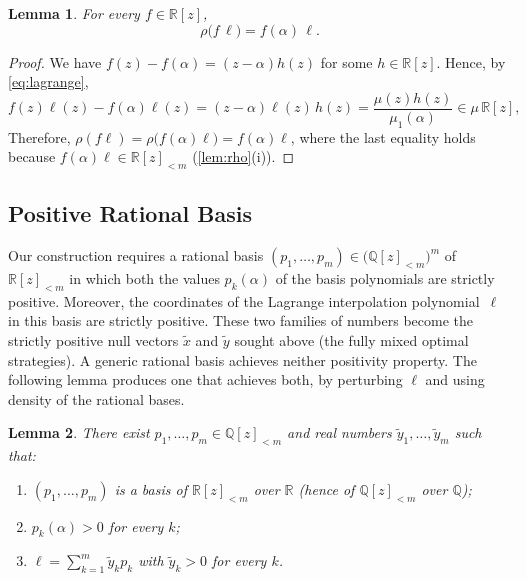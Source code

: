 \documentclass[11pt, a4paper]{article}
\theoremstyle{plain}
\newtheorem{lemma}{Lemma}
\theoremstyle{definition}
\newcommand{\Q}{\mathbb{Q}}
\newcommand{\R}{\mathbb{R}}
\newcommand{\PP}{\R[z]_{<m}}
\newcommand{\PQ}{\Q[z]_{<m}}
\begin{document}
\begin{lemma}\label{lem:absorption}
For every $f\in\R[z]$,
\[
\rho\bigl(f\,\ell\bigr)=f(\alpha)\,\ell .
\]
\end{lemma}

\begin{proof}
We have $f(z)-f(\alpha)=(z-\alpha)h(z)$ for some $h\in\R[z]$. Hence, by \cref{eq:lagrange},
\[
f(z)\ell(z)-f(\alpha)\ell(z)=(z-\alpha)\ell(z)\,h(z)=\frac{\mu(z)h(z)}{\mu_1(\alpha)}\in\mu\,\R[z],
\]
Therefore, $\rho(f\ell)=\rho\bigl(f(\alpha)\ell\bigr)=f(\alpha)\ell$, where the last equality holds because $f(\alpha)\ell\in\PP$ (\cref{lem:rho}(i)).
\end{proof}

\subsection{Positive Rational Basis}

Our construction requires a rational basis $(p_1,\dots,p_m) \in \big(\PQ \big)^m$ of $\PP$ in which both the values $p_k(\alpha)$ of the basis polynomials are strictly positive. Moreover, the coordinates of the Lagrange interpolation polynomial~$\ell$ in this basis are strictly positive.
These two families of numbers become the strictly positive null vectors $\tilde x$ and $\tilde y$ sought above (the fully mixed optimal strategies).
A generic rational basis achieves neither positivity property.
The following lemma produces one that achieves both, by perturbing $\ell$ and using density of the rational bases.

\begin{lemma}\label{lem:basis}
There exist $p_1,\dots,p_m\in\PQ$ and real numbers $\tilde y_1,\dots,\tilde y_m$ such that:
\begin{enumerate}
\item[\emph{(i)}] $(p_1,\dots,p_m)$ is a basis of $\PP$ over $\R$ (hence of $\PQ$ over $\Q$);
\item[\emph{(ii)}] $p_k(\alpha)>0$ for every $k$;
\item[\emph{(iii)}] $\ell=\sum_{k=1}^m\tilde y_kp_k$ with $\tilde y_k>0$ for every $k$.
\end{enumerate}
\end{lemma}
\end{document}
